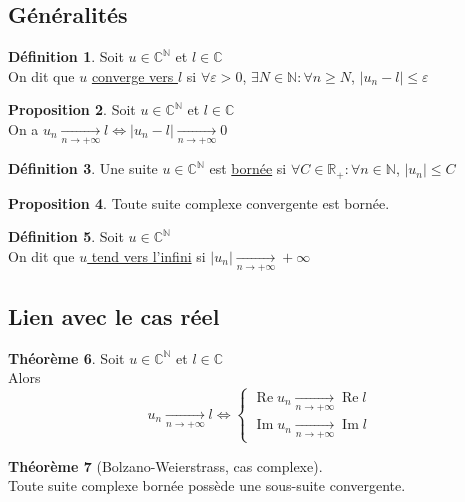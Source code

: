 \documentclass[10pt,a4paper]{article}
\theoremstyle{definition}
\newtheorem{proposition}{Proposition}[section]
\newtheorem{theorem}[proposition]{Théorème}
\newtheorem{definition}[proposition]{Définition}
\DeclareMathOperator{\re}{Re}
\DeclareMathOperator{\im}{Im}
\begin{document}
\subsection{Généralités}
\begin{definition}
Soit $u \in \mathbb{C}^\mathbb{N}$ et $l \in \mathbb{C}$ \\
On dit que $u$ \uline{converge vers $l$} si $\forall \varepsilon > 0$, $\exists N \in \mathbb{N}: \forall n \geq N$, $\left| u_n - l \right| \leq \varepsilon$
\end{definition}
\begin{proposition}
Soit $u \in \mathbb{C}^\mathbb{N}$ et $l \in \mathbb{C}$ \\
On a $u_n \xrightarrow[n \to +\infty]{} l \iff \left| u_n - l \right| \xrightarrow[n \to +\infty]{} 0$
\end{proposition}
\begin{definition}
Une suite $u \in \mathbb{C}^\mathbb{N}$ est \uline{bornée} si $\forall C \in \mathbb{R}_+: \forall n \in \mathbb{N}$, $|u_n| \leq C$
\end{definition}
\begin{proposition}
Toute suite complexe convergente est bornée.
\end{proposition}
\begin{definition}
Soit $u \in \mathbb{C}^\mathbb{N}$ \\
On dit que \uline{$u$ tend vers l'infini} si $|u_n| \xrightarrow[n \to +\infty]{} +\infty$
\end{definition}

\subsection{Lien avec le cas réel}
\begin{theorem}
Soit $u \in \mathbb{C}^\mathbb{N}$ et $l \in \mathbb{C}$ \\
Alors
\[ u_n \xrightarrow[n \to +\infty]{} l \iff \begin{cases}
\re u_n \xrightarrow[n \to +\infty]{} \re l \\
\im u_n \xrightarrow[n \to +\infty]{} \im l
\end{cases}\]
\end{theorem}
\begin{theorem}[Bolzano-Weierstrass, cas complexe]
\hfill \\
Toute suite complexe bornée possède une sous-suite convergente.
\end{theorem}
\end{document}

